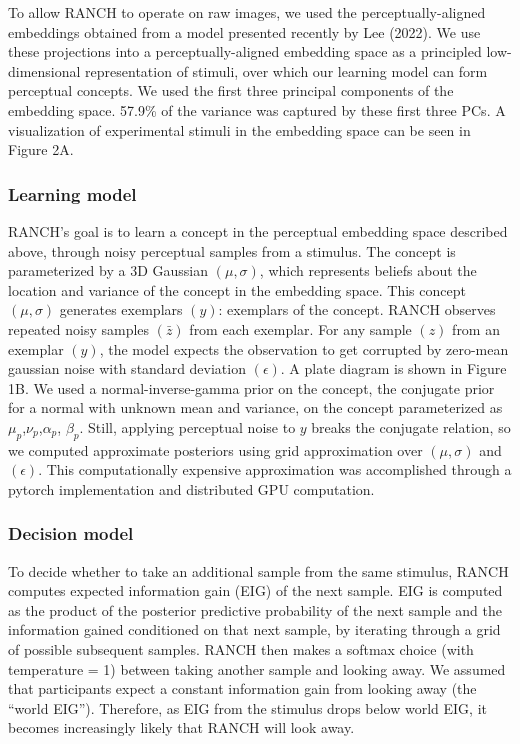 \documentclass[10pt, letterpaper]{article}
\begin{document}
To allow RANCH to operate on raw images, we used the
perceptually-aligned embeddings obtained from a model presented recently
by Lee (2022). We use these projections into a perceptually-aligned
embedding space as a principled low-dimensional representation of
stimuli, over which our learning model can form perceptual concepts. We
used the first three principal components of the embedding space. 57.9\%
of the variance was captured by these first three PCs. A visualization
of experimental stimuli in the embedding space can be seen in Figure 2A.

\hypertarget{learning-model}{%
\subsubsection{Learning model}\label{learning-model}}

RANCH's goal is to learn a concept in the perceptual embedding space
described above, through noisy perceptual samples from a stimulus. The
concept is parameterized by a 3D Gaussian \((\mu,\sigma)\), which
represents beliefs about the location and variance of the concept in the
embedding space. This concept \((\mu,\sigma)\) generates exemplars
\((y)\): exemplars of the concept. RANCH observes repeated noisy samples
\((\bar{z})\) from each exemplar. For any sample \((z)\) from an
exemplar \((y)\), the model expects the observation to get corrupted by
zero-mean gaussian noise with standard deviation \((\epsilon)\). A plate
diagram is shown in Figure 1B. We used a normal-inverse-gamma prior on
the concept, the conjugate prior for a normal with unknown mean and
variance, on the concept parameterized as
\(\mu_{p}\),\(\nu_{p}\),\(\alpha_{p}\), \(\beta_{p}\). Still, applying
perceptual noise to \(y\) breaks the conjugate relation, so we computed
approximate posteriors using grid approximation over \((\mu,\sigma)\)
and \((\epsilon)\). This computationally expensive approximation was
accomplished through a pytorch implementation and distributed GPU
computation.

\hypertarget{decision-model}{%
\subsubsection{Decision model}\label{decision-model}}

To decide whether to take an additional sample from the same stimulus,
RANCH computes expected information gain (EIG) of the next sample. EIG
is computed as the product of the posterior predictive probability of
the next sample and the information gained conditioned on that next
sample, by iterating through a grid of possible subsequent samples.
RANCH then makes a softmax choice (with temperature = 1) between taking
another sample and looking away. We assumed that participants expect a
constant information gain from looking away (the ``world EIG'').
Therefore, as EIG from the stimulus drops below world EIG, it becomes
increasingly likely that RANCH will look away.
\end{document}
